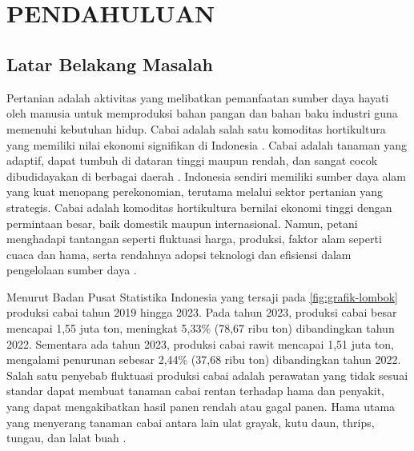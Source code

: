
\chapter[PENDAHULUAN]{\\ PENDAHULUAN}

\section{Latar Belakang Masalah}
Pertanian adalah aktivitas yang melibatkan pemanfaatan sumber daya hayati oleh manusia untuk memproduksi bahan pangan dan bahan baku industri guna memenuhi kebutuhan hidup. Cabai adalah salah satu komoditas hortikultura yang memiliki nilai ekonomi signifikan di Indonesia \cite{gulo2023identifikasi}. Cabai adalah tanaman yang adaptif, dapat tumbuh di dataran tinggi maupun rendah, dan sangat cocok dibudidayakan di berbagai daerah \cite{sumung2023strategi}.  Indonesia sendiri memiliki sumber daya alam yang kuat menopang perekonomian, terutama melalui sektor pertanian yang strategis. Cabai adalah komoditas hortikultura bernilai ekonomi tinggi dengan permintaan besar, baik domestik maupun internasional. Namun, petani menghadapi tantangan seperti fluktuasi harga, produksi, faktor alam seperti cuaca dan hama, serta rendahnya adopsi teknologi dan efisiensi dalam pengelolaan sumber daya \cite{zamrodah2020pendapatan}. 

Menurut Badan Pusat Statistika Indonesia yang tersaji pada \cref{fig:grafik-lombok} produksi cabai tahun 2019 hingga 2023. Pada tahun 2023, produksi cabai besar mencapai 1,55 juta ton, meningkat 5,33\% (78,67 ribu ton) dibandingkan tahun 2022. Sementara ada tahun 2023, produksi cabai rawit mencapai 1,51 juta ton, mengalami penurunan sebesar 2,44\% (37,68 ribu ton) dibandingkan tahun 2022. Salah satu penyebab fluktuasi produksi cabai adalah perawatan yang tidak sesuai standar dapat membuat tanaman cabai rentan terhadap hama dan penyakit, yang dapat mengakibatkan hasil panen rendah atau gagal panen. Hama utama yang menyerang tanaman cabai antara lain ulat grayak, kutu daun, thrips, tungau, dan lalat buah \cite{fitriani2020penerapan}.

